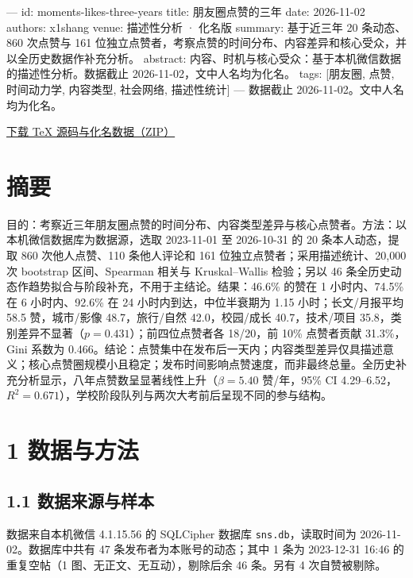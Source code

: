 ---
id: moments-likes-three-years
title: 朋友圈点赞的三年
date: 2026-11-02
authors: x1shang
venue: 描述性分析 · 化名版
summary: 基于近三年 20 条动态、860 次点赞与 161 位独立点赞者，考察点赞的时间分布、内容差异和核心受众，并以全历史数据作补充分析。
abstract: 内容、时机与核心受众：基于本机微信数据的描述性分析。数据截止 2026-11-02，文中人名均为化名。
tags: [朋友圈, 点赞, 时间动力学, 内容类型, 社会网络, 描述性统计]
---
\noindent 数据截止 2026-11-02。文中人名均为化名。

\href{assets/papers/moments-likes-analysis/source.zip}{下载 TeX 源码与化名数据（ZIP）}

\section*{摘要}
目的：考察近三年朋友圈点赞的时间分布、内容类型差异与核心点赞者。方法：以本机微信数据库为数据源，选取 2023-11-01 至 2026-10-31 的 20 条本人动态，提取 860 次他人点赞、110 条他人评论和 161 位独立点赞者；采用描述统计、20,000 次 bootstrap 区间、Spearman 相关与 Kruskal--Wallis 检验；另以 46 条全历史动态作趋势拟合与阶段补充，不用于主结论。结果：46.6\% 的赞在 1 小时内、74.5\% 在 6 小时内、92.6\% 在 24 小时内到达，中位半衰期为 1.15 小时；长文/月报平均 58.5 赞，城市/影像 48.7，旅行/自然 42.0，校园/成长 40.7，技术/项目 35.8，类别差异不显著（$p=0.431$）；前四位点赞者各 18/20，前 10\% 点赞者贡献 31.3\%，Gini 系数为 0.466。结论：点赞集中在发布后一天内；内容类型差异仅具描述意义；核心点赞圈规模小且稳定；发布时间影响点赞速度，而非最终总量。全历史补充分析显示，八年点赞数呈显著线性上升（$\beta=5.40$ 赞/年，95\% CI 4.29--6.52，$R^2=0.671$），学校阶段队列与两次大考前后呈现不同的参与结构。


\section{1 数据与方法}

\subsection{1.1 数据来源与样本}
数据来自本机微信 4.1.15.56 的 SQLCipher 数据库 \texttt{sns.db}，读取时间为 2026-11-02。数据库中共有 47 条发布者为本账号的动态；其中 1 条为 2023-12-31 16:46 的重复空帖（1 图、无正文、无互动），剔除后余 46 条。另有 4 次自赞被剔除。

